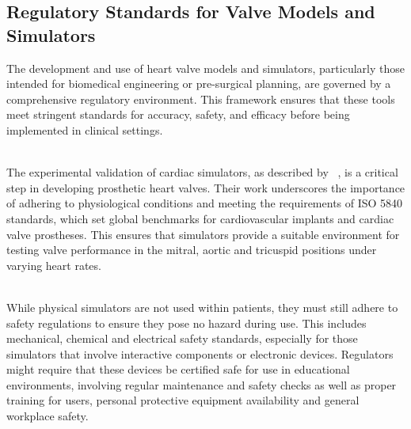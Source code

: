 \subsection{Regulatory Standards for Valve Models and Simulators}
The development and use of heart valve models and simulators, particularly those intended for biomedical engineering or pre-surgical planning, are governed by a comprehensive regulatory environment. This framework ensures that these tools meet stringent standards for accuracy, safety, and efficacy before being implemented in clinical settings.

\\
The experimental validation of cardiac simulators, as described by ~, is a critical step in developing prosthetic heart valves. Their work underscores the importance of adhering to physiological conditions and meeting the requirements of ISO 5840 standards, which set global benchmarks for cardiovascular implants and cardiac valve prostheses. This ensures that simulators provide a suitable environment for testing valve performance in the mitral, aortic and tricuspid positions under varying heart rates.

\\
While physical simulators are not used within patients, they must still adhere to safety regulations to ensure they pose no hazard during use. This includes mechanical, chemical and electrical safety standards, especially for those simulators that involve interactive components or electronic devices. Regulators might require that these devices be certified safe for use in educational environments, involving regular maintenance and safety checks as well as proper training for users, personal protective equipment availability and general workplace safety.


